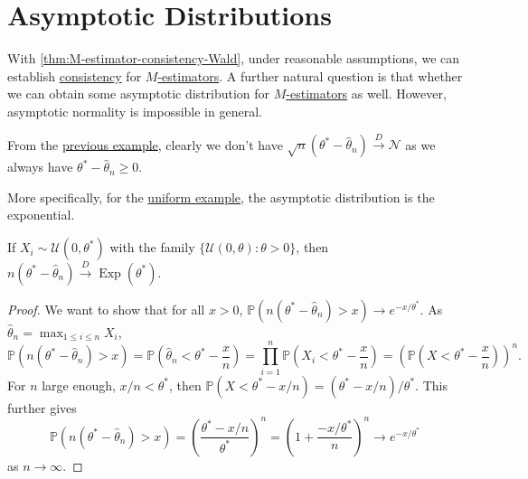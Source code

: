 \section{Asymptotic Distributions}
With \autoref{thm:M-estimator-consistency-Wald}, under reasonable assumptions, we can establish \hyperref[def:consistent]{consistency} for \hyperref[def:M-estimator]{\(M\)-estimators}. A further natural question is that whether we can obtain some asymptotic distribution for \hyperref[def:M-estimator]{\(M\)-estimators} as well. However, asymptotic normality is impossible in general.

\begin{eg}\label{eg:uniform-is-not-asymptotically-normal}
	From the \hyperref[eg:uniform-MLE]{previous example}, clearly we don't have \(\sqrt{n} (\theta^{\ast} - \hat{\theta} _n) \overset{D}{\to} \mathcal{N} \) as we always have \(\theta ^{\ast} - \hat{\theta} _n \geq 0\).
\end{eg}

More specifically, for the \hyperref[eg:uniform-MLE]{uniform example}, the asymptotic distribution is the exponential.

\begin{proposition}\label{prop:uniform-MLE-asymptotic-distribution}
	If \(X_i \sim \mathcal{U} (0, \theta ^{\ast} )\) with the family \(\{\mathcal{U} (0, \theta ) \colon \theta > 0 \} \), then \(n (\theta ^{\ast} - \hat{\theta} _n) \overset{D}{\to} \operatorname{Exp}(\theta ^{\ast} )\).
\end{proposition}
\begin{proof}
	We want to show that for all \(x > 0\), \(\mathbb{P} (n(\theta ^{\ast} - \hat{\theta} _n) > x) \to e^{- x / \theta ^{\ast} }\). As \(\hat{\theta} _n = \max _{1 \leq i \leq n} X_i\),
	\[
		\mathbb{P} (n(\theta ^{\ast} - \hat{\theta} _n) > x)
		= \mathbb{P} \left( \hat{\theta} _n <\theta ^{\ast} - \frac{x}{n} \right)
		= \prod_{i=1}^{n} \mathbb{P} \left( X_i < \theta ^{\ast} - \frac{x}{n} \right)
		= \left( \mathbb{P} \left( X < \theta ^{\ast} - \frac{x}{n} \right) \right) ^n.
	\]
	For \(n\) large enough, \(x / n < \theta ^{\ast} \), then \(\mathbb{P} (X < \theta ^{\ast} - x / n) = (\theta ^{\ast} - x / n) / \theta ^{\ast} \). This further gives
	\[
		\mathbb{P} (n(\theta ^{\ast} - \hat{\theta} _n) > x)
		= \left( \frac{\theta ^{\ast} - x / n}{\theta ^{\ast} } \right) ^n
		= \left( 1 + \frac{- x / \theta ^{\ast} }{n} \right) ^n
		\to e^{- x / \theta ^{\ast} }
	\]
	as \(n \to \infty \).
\end{proof}

